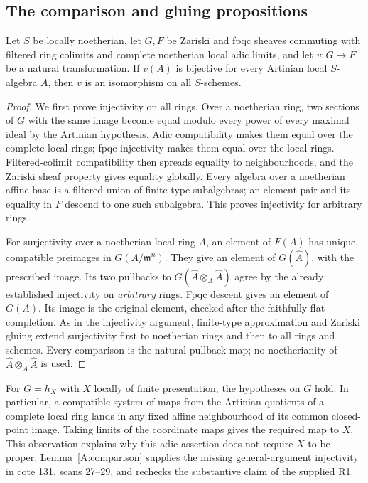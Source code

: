 \subsection{The comparison and gluing propositions}

\begin{lemma}\label{A:comparison}
Let $S$ be locally noetherian, let $G,F$ be Zariski and fpqc sheaves
commuting with filtered ring colimits and complete noetherian local
adic limits, and let $v:G\to F$ be a natural transformation. If
$v(A)$ is bijective for every Artinian local $S$-algebra $A$, then
$v$ is an isomorphism on all $S$-schemes.
\end{lemma}
\begin{proof}
We first prove injectivity on all rings. Over a noetherian ring, two
sections of $G$ with the same image become equal modulo every power
of every maximal ideal by the Artinian hypothesis. Adic compatibility
makes them equal over the complete local rings; fpqc injectivity makes
them equal over the local rings. Filtered-colimit compatibility then
spreads equality to neighbourhoods, and the Zariski sheaf property
gives equality globally. Every algebra over a noetherian affine base
is a filtered union of finite-type subalgebras; an element pair and
its equality in $F$ descend to one such subalgebra. This proves
injectivity for arbitrary rings.

For surjectivity over a noetherian local ring $A$, an element of
$F(A)$ has unique, compatible preimages in $G(A/\mathfrak m^n)$.
They give an element of $G(\widehat A)$, with the prescribed image.
Its two pullbacks to $G(\widehat A\otimes_A\widehat A)$ agree by
the already established injectivity on \emph{arbitrary} rings.
Fpqc descent gives an element of $G(A)$. Its image is the original
element, checked after the faithfully flat completion. As in the
injectivity argument, finite-type approximation and Zariski gluing
extend surjectivity first to noetherian rings and then to all rings
and schemes. Every comparison is the natural pullback map; no
noetherianity of $\widehat A\otimes_A\widehat A$ is used.
\end{proof}

For $G=h_X$ with $X$ locally of finite presentation, the hypotheses on
$G$ hold. In particular, a compatible system of maps from the
Artinian quotients of a complete local ring lands in any fixed affine
neighbourhood of its common closed-point image. Taking limits of the
coordinate maps gives the required map to $X$. This observation
explains why this adic assertion does not require $X$ to be proper.
Lemma~\ref{A:comparison} supplies the missing general-argument
injectivity in cote 131, scans 27--29, and rechecks the substantive
claim of the supplied R1.

